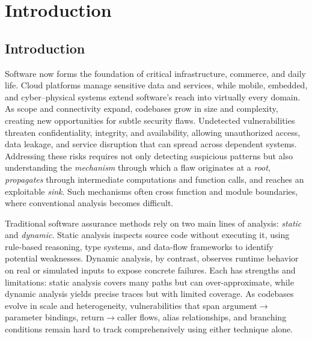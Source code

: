 \documentclass{buthesis}
\begin{document}
\figurespagetrue
\tablespagetrue

\afterpreface


\chapter{Introduction}
\label{chap:intro}

\section{Introduction}

Software now forms the foundation of critical infrastructure, commerce, and daily life. 
Cloud platforms manage sensitive data and services, while mobile, embedded, and cyber–physical systems extend software’s reach into virtually every domain. 
As scope and connectivity expand, codebases grow in size and complexity, creating new opportunities for subtle security flaws. 
Undetected vulnerabilities threaten confidentiality, integrity, and availability, allowing unauthorized access, data leakage, and service disruption that can spread across dependent systems. 
Addressing these risks requires not only detecting suspicious patterns but also understanding the \emph{mechanism} through which a flaw originates at a \emph{root}, 
\emph{propagates} through intermediate computations and function calls, and reaches an exploitable \emph{sink}. 
Such mechanisms often cross function and module boundaries, where conventional analysis becomes difficult.

Traditional software assurance methods rely on two main lines of analysis: \emph{static} and \emph{dynamic}. 
Static analysis inspects source code without executing it, using rule-based reasoning, type systems, and data-flow frameworks to identify potential weaknesses. 
Dynamic analysis, by contrast, observes runtime behavior on real or simulated inputs to expose concrete failures. 
Each has strengths and limitations: static analysis covers many paths but can over-approximate, while dynamic analysis yields precise traces but with limited coverage. 
As codebases evolve in scale and heterogeneity, vulnerabilities that span argument$\rightarrow$parameter bindings, return$\rightarrow$caller flows, alias relationships, and branching conditions remain hard to track comprehensively using either technique alone.
\end{document}
